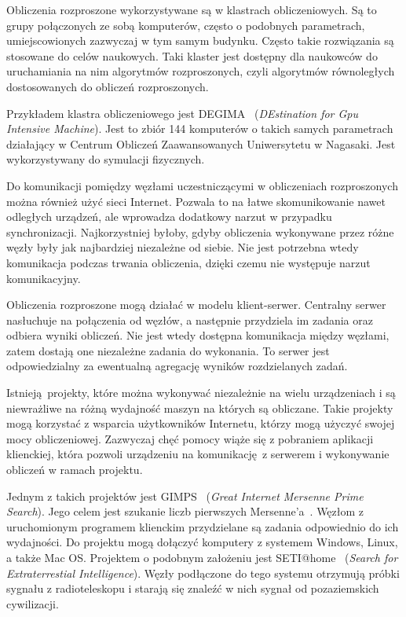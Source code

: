 \documentclass[a4paper,11pt,twoside]{report}
\theoremstyle{definition}
\begin{document}
    Obliczenia rozproszone wykorzystywane są w klastrach obliczeniowych.
    Są to grupy połączonych ze sobą komputerów, często o podobnych parametrach, umiejscowionych zazwyczaj w tym samym budynku.
    Często takie rozwiązania są stosowane do celów naukowych.
    Taki klaster jest dostępny dla naukowców do uruchamiania na nim algorytmów rozproszonych, czyli algorytmów równoległych dostosowanych do obliczeń rozproszonych.
    
    Przykładem klastra obliczeniowego jest DEGIMA~\cite{DEGIMA} (\textit{DEstination for Gpu Intensive Machine}).
    Jest to zbiór 144 komputerów o takich samych parametrach działający w Centrum Obliczeń Zaawansowanych Uniwersytetu w Nagasaki.
    Jest wykorzystywany do symulacji fizycznych.
    
    Do komunikacji pomiędzy węzłami uczestniczącymi w obliczeniach rozproszonych można również użyć sieci Internet.
    Pozwala to na łatwe skomunikowanie nawet odległych urządzeń, ale wprowadza dodatkowy narzut w przypadku synchronizacji.
    Najkorzystniej byłoby, gdyby obliczenia wykonywane przez różne węzły były jak najbardziej niezależne od siebie.
    Nie jest potrzebna wtedy komunikacja podczas trwania obliczenia, dzięki czemu nie występuje narzut komunikacyjny.
    
    Obliczenia rozproszone mogą działać w modelu klient-serwer.
    Centralny serwer nasłuchuje na połączenia od węzłów, a następnie przydziela im zadania oraz odbiera wyniki obliczeń.
    Nie jest wtedy dostępna komunikacja między węzłami, zatem dostają one niezależne zadania do wykonania.
    To serwer jest odpowiedzialny za ewentualną agregację wyników rozdzielanych zadań.
    
    Istnieją projekty, które można wykonywać niezależnie na wielu urządzeniach i są niewrażliwe na różną wydajność maszyn na których są obliczane.
    Takie projekty mogą korzystać z wsparcia użytkowników Internetu, którzy mogą użyczyć swojej mocy obliczeniowej.
    Zazwyczaj chęć pomocy wiąże się z pobraniem aplikacji klienckiej, która pozwoli urządzeniu na komunikację z serwerem i wykonywanie obliczeń w ramach projektu.
    
    Jednym z takich projektów jest GIMPS~\cite{GIMPS} (\textit{Great Internet Mersenne Prime Search}).
    Jego celem jest szukanie liczb pierwszych Mersenne'a~\cite{MersennePrimes}.
    Węzłom z uruchomionym programem klienckim przydzielane są zadania odpowiednio do ich wydajności.
    Do projektu mogą dołączyć komputery z systemem Windows, Linux, a także Mac OS.
    Projektem o podobnym założeniu jest SETI@home~\cite{SETI} (\textit{\textit{Search for Extraterrestial Intelligence}}).
    Węzły podłączone do tego systemu otrzymują próbki sygnału z radioteleskopu i starają się znaleźć w nich sygnał od pozaziemskich cywilizacji.
    
\end{document}
